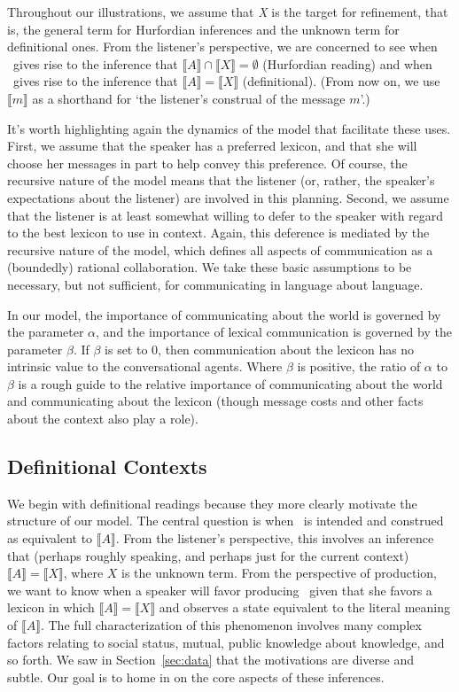 \documentclass[12pt,twoside]{article}
\newcommand{\secref}[1]{Section~\ref{#1}}
\newcommand{\word}[1]{\emph{#1}}
\newcommand{\sem}[1]{\ensuremath{\llbracket#1\rrbracket}}
\newcommand{\msg}{m}
\renewcommand{\_}{\textbf{\textunderscore\hspace{-4pt}\textunderscore\hspace{-3pt}\textunderscore\hspace{-4pt}\textunderscore}\hspace{0.5pt}}			%
\begin{document}
Throughout our illustrations, we assume that \word{X} is the target
for refinement, that is, the general term for Hurfordian inferences
and the unknown term for definitional ones.  From the listener's
perspective, we are concerned to see when \AorX\ gives rise to
the inference that $\sem{A} \cap \sem{X} = \emptyset$ (Hurfordian
reading) and when \AorX\ gives rise to the inference that
$\sem{A} = \sem{X}$ (definitional). (From now on, we use $\sem{\msg}$
as a shorthand for `the listener's construal of the message $\msg$'.)

It's worth highlighting again the dynamics of the model that
facilitate these uses. First, we assume that the speaker has a
preferred lexicon, and that she will choose her messages in part to
help convey this preference. Of course, the recursive nature of the
model means that the listener (or, rather, the speaker's expectations
about the listener) are involved in this planning. Second, we assume
that the listener is at least somewhat willing to defer to the speaker
with regard to the best lexicon to use in context. Again, this
deference is mediated by the recursive nature of the model, which
defines all aspects of communication as a (boundedly) rational
collaboration. We take these basic assumptions to be necessary, but
not sufficient, for communicating in language about language.

In our model, the importance of communicating about the world is
governed by the parameter $\alpha$, and the importance of lexical
communication is governed by the parameter $\beta$. If $\beta$ is set
to $0$, then communication about the lexicon has no intrinsic value to
the conversational agents.  Where $\beta$ is positive, the ratio of
$\alpha$ to $\beta$ is a rough guide to the relative importance of
communicating about the world and communicating about the lexicon
(though message costs and other facts about the context also play a
role).


\subsection{Definitional Contexts}\label{sec:analysis:definitional}

We begin with definitional readings because they more clearly motivate
the structure of our model. The central question is when
\AorX\ is intended and construed as equivalent to
$\sem{A}$. From the listener's perspective, this involves an inference
that (perhaps roughly speaking, and perhaps just for the current
context) $\sem{A}=\sem{X}$, where $X$ is the unknown term. From the
perspective of production, we want to know when a speaker will favor
producing \AorX\ given that she favors a lexicon in which
$\sem{A}=\sem{X}$ and observes a state equivalent to the literal
meaning of $\sem{A}$. The full characterization of this phenomenon
involves many complex factors relating to social status, mutual,
public knowledge about knowledge, and so forth. We saw in
\secref{sec:data} that the motivations are diverse and subtle. Our
goal is to home in on the core aspects of these inferences.
\end{document}
